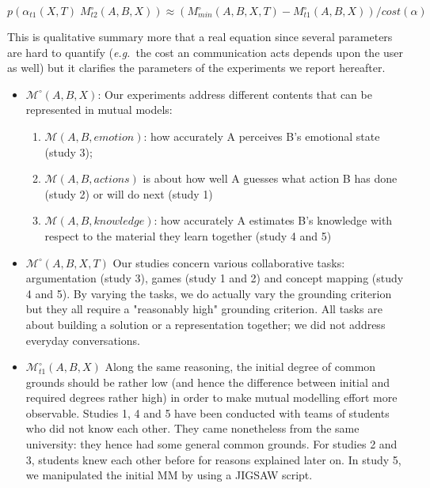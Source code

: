 \documentclass{report}
\newcommand{\eg}{{\textit{e.g.\ }}}
\newcommand{\model}[3]{{$\mathcal{M}(#1, #2, #3)$}}
\newcommand{\Model}[3]{{$\mathcal{M}^{\circ}(#1, #2, #3)$}}
\begin{document}
$p(\alpha_{t1}(X,T)   M^{\circ}_{t2}(A,B,X)) ≈ (M^{\circ}_{min}(A,B,X,T) -
M^{\circ}_{t1}(A,B,X))/cost (\alpha)$

This is qualitative summary more that a real equation since several parameters
are hard to quantify (\eg the cost an communication acts depends upon the user
as well) but it clarifies the parameters of the experiments we report hereafter.

\begin{itemize}
    \item \Model{A}{B}{X}: Our experiments address different contents that can be
        represented in mutual models:

        \begin{enumerate}
            \item \model{A}{B}{emotion}: how accurately A perceives B's emotional state
                (study 3); 

            \item \model{A}{B}{actions} is about how well A guesses what action B has
                done (study 2) or will do next  (study 1)

            \item \model{A}{B}{knowledge}: how accurately A estimates B's knowledge
                with respect to the material they learn together (study 4 and 5)

        \end{enumerate}

    \item \Model{A,B}{X}{T} Our studies concern various collaborative tasks:
        argumentation (study 3), games (study 1 and 2) and concept mapping
        (study 4 and 5). By varying the tasks, we do actually vary the grounding
        criterion but they all require a "reasonably high" grounding criterion.
        All tasks are about building a solution or a representation together; we
        did not address everyday conversations. 

    \item $\mathcal{M}^{\circ}_{t1}(A,B,X)$ Along the same reasoning, the initial degree
        of common grounds should be rather low (and hence the difference between
        initial and required degrees rather high) in order to make mutual
        modelling effort more observable. Studies 1, 4 and 5 have been conducted
        with teams of students who did not know each other. They came
        nonetheless from the same university: they hence had some general common
        grounds.  For studies 2 and 3, students knew each other before for
        reasons explained later on. In study 5, we manipulated the initial MM by
        using a JIGSAW script.


\end{itemize}
\end{document}
